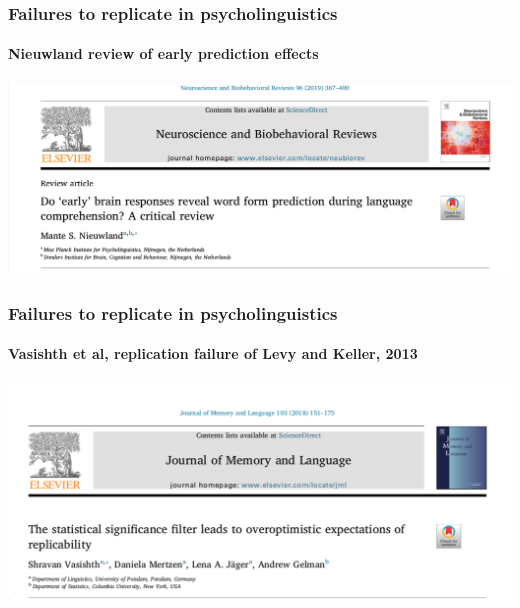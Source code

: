 \documentclass{beamer}
\begin{document}

\begin{frame}
\frametitle{Failures to replicate in psycholinguistics}
\framesubtitle{Nieuwland review of early prediction effects}

\begin{center}
\includegraphics[scale=0.2]{nieuwland2019.png}
\end{center}


\end{frame}


\begin{frame}
\frametitle{Failures to replicate in psycholinguistics}
\framesubtitle{Vasishth et al, replication failure of Levy and Keller, 2013}

\begin{center}
\includegraphics[scale=0.4]{vasishth2018.png}
\end{center}

\end{frame}






\end{document}

